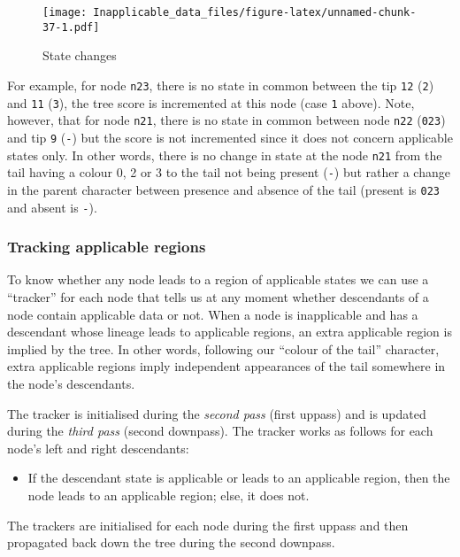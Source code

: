 \documentclass[]{book}
\providecommand{\tightlist}{%
  \setlength{\itemsep}{0pt}\setlength{\parskip}{0pt}}
\theoremstyle{definition}
\theoremstyle{definition}
\theoremstyle{definition}
\theoremstyle{remark}
\begin{document}
\begin{figure}
\centering
\texttt{[image: Inapplicable\_data\_files/figure-latex/unnamed-chunk-37-1.pdf]}
\caption{\label{fig:unnamed-chunk-37}State changes}
\end{figure}

For example, for node \texttt{n23}, there is no state in common between
the tip \texttt{12} (\texttt{2}) and \texttt{11} (\texttt{3}), the tree
score is incremented at this node (case \texttt{1} above). Note,
however, that for node \texttt{n21}, there is no state in common between
node \texttt{n22} (\texttt{023}) and tip \texttt{9} (\texttt{-}) but the
score is not incremented since it does not concern applicable states
only. In other words, there is no change in state at the node
\texttt{n21} from the tail having a colour 0, 2 or 3 to the tail not
being present (\texttt{-}) but rather a change in the parent character
between presence and absence of the tail (present is \texttt{023} and
absent is \texttt{-}).

\hypertarget{tracking-applicable-regions}{%
\subsubsection{Tracking applicable
regions}\label{tracking-applicable-regions}}

To know whether any node leads to a region of applicable states we can
use a ``tracker'' for each node that tells us at any moment whether
descendants of a node contain applicable data or not. When a node is
inapplicable and has a descendant whose lineage leads to applicable
regions, an extra applicable region is implied by the tree. In other
words, following our ``colour of the tail'' character, extra applicable
regions imply independent appearances of the tail somewhere in the
node's descendants.

The tracker is initialised during the \emph{second pass} (first uppass)
and is updated during the \emph{third pass} (second downpass). The
tracker works as follows for each node's left and right descendants:

\begin{itemize}
\tightlist
\item
  If the descendant state is applicable or leads to an applicable
  region, then the node leads to an applicable region; else, it does
  not.
\end{itemize}

The trackers are initialised for each node during the first uppass and
then propagated back down the tree during the second downpass.
\end{document}

